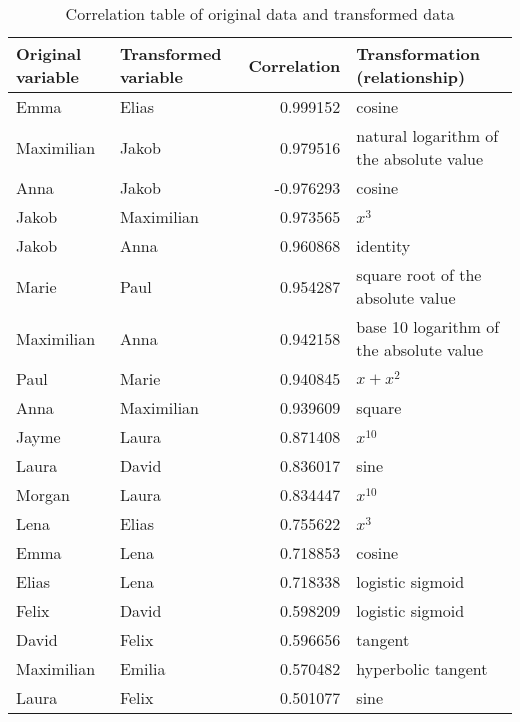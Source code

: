 \begin{table}[ht!]
\begin{tabular}{|l|l|r|l|}
\hline
Original variable & Transformed variable &  Correlation & Transformation (relationship) \\
\hline
            Emma &      Elias &  0.999152 &                                  cosine \\
      Maximilian &      Jakob &  0.979516 & natural logarithm of the absolute value \\
            Anna &      Jakob & -0.976293 &                                  cosine \\
            Jakob & Maximilian &  0.973565 &                                 $x ^ 3$ \\
            Jakob &       Anna &  0.960868 &                                identity \\
            Marie &       Paul &  0.954287 &       square root of the absolute value \\
      Maximilian &       Anna &  0.942158 & base 10 logarithm of the absolute value \\
            Paul &      Marie &  0.940845 &                             $x + x ^ 2$ \\
            Anna & Maximilian &  0.939609 &                                  square \\
            Jayme &      Laura &  0.871408 &                              $x ^ {10}$ \\
            Laura &      David &  0.836017 &                                    sine \\
            Morgan &      Laura &  0.834447 &                              $x ^ {10}$ \\
            Lena &      Elias &  0.755622 &                                 $x ^ 3$ \\
            Emma &       Lena &  0.718853 &                                  cosine \\
            Elias &       Lena &  0.718338 &                        logistic sigmoid \\
            Felix &      David &  0.598209 &                        logistic sigmoid \\
            David &      Felix &  0.596656 &                                 tangent \\
      Maximilian &     Emilia &  0.570482 &                      hyperbolic tangent \\
            Laura &      Felix &  0.501077 &                                    sine \\
\hline
\end{tabular}
\caption{Correlation table of original data and transformed data}
\label{tab:corr_transformation_table}
\end{table}

